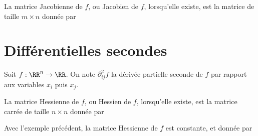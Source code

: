 \documentclass{article}
\begin{document}
\begin{defn} La matrice Jacobienne de $f$, ou Jacobien de $f$, lorsqu'elle existe, est la matrice de taille $m \times n$ donnée par
\end{defn}

\section{Différentielles secondes}

Soit $f : \RR^n \to \RR$. On note $\partial_{ij}^2 f$ la dérivée partielle seconde de $f$ par rapport aux variables $x_i$ puis $x_j$.

\begin{defn}
	La matrice Hessienne de $f$, ou Hessien de $f$, lorsqu'elle existe, est la matrice carrée de taille $n \times n$ donnée par
\end{defn}

\begin{exmp}
	Avec l'exemple précédent, la matrice Hessienne de $f$ est constante, et donnée par
\end{exmp}
\end{document}
